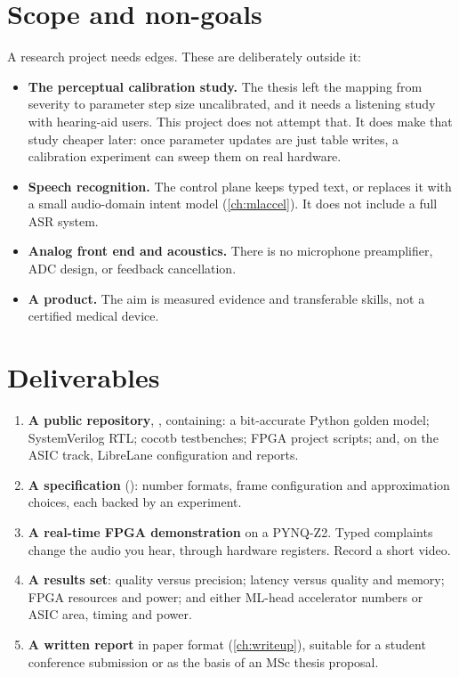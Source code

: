 \section{Scope and non-goals}\label{sec:overview:scope}

A research project needs edges. These are deliberately outside it:

\begin{itemize}
  \item \textbf{The perceptual calibration study.} The thesis left the mapping
  from severity to parameter step size uncalibrated, and it needs a listening
  study with hearing-aid users. This project does not attempt that. It does make
  that study cheaper later: once parameter updates are just table writes, a
  calibration experiment can sweep them on real hardware.
  \item \textbf{Speech recognition.} The control plane keeps typed text, or
  replaces it with a small audio-domain intent model (\cref{ch:mlaccel}). It does
  not include a full ASR system.
  \item \textbf{Analog front end and acoustics.} There is no microphone
  preamplifier, ADC design, or feedback cancellation.
  \item \textbf{A product.} The aim is measured evidence and transferable
  skills, not a certified medical device.
\end{itemize}

\section{Deliverables}\label{sec:overview:deliverables}

\begin{enumerate}
  \item \textbf{A public repository}, , containing:
        a bit-accurate Python golden model; SystemVerilog RTL; cocotb
        testbenches; FPGA project scripts; and, on the ASIC track, LibreLane
        configuration and reports.
  \item \textbf{A specification} (): number formats, frame
        configuration and approximation choices, each backed by an experiment.
  \item \textbf{A real-time FPGA demonstration} on a PYNQ-Z2. Typed complaints
        change the audio you hear, through hardware registers. Record a short
        video.
  \item \textbf{A results set}: quality versus precision; latency versus quality
        and memory; FPGA resources and power; and either ML-head accelerator
        numbers or ASIC area, timing and power.
  \item \textbf{A written report} in paper format (\cref{ch:writeup}), suitable
        for a student conference submission or as the basis of an MSc thesis
        proposal.
\end{enumerate}

